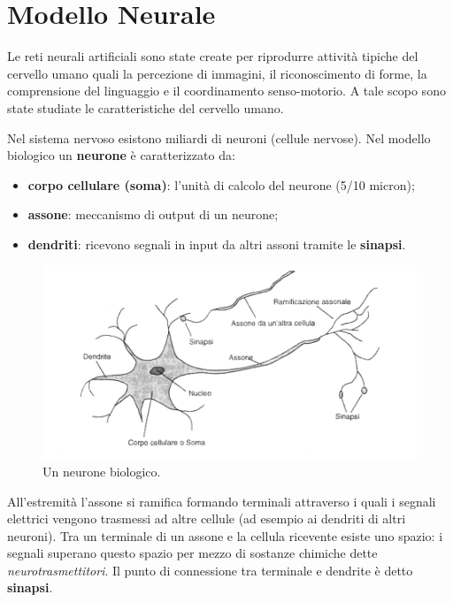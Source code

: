 
\chapter{Modello Neurale}
\label{cha:modello_neurale}

Le reti neurali artificiali sono state create per riprodurre attività tipiche del cervello umano quali la percezione di immagini, il riconoscimento di forme, la comprensione del linguaggio e il coordinamento senso-motorio. A tale scopo sono state studiate le caratteristiche del cervello umano.								

Nel sistema nervoso esistono miliardi di neuroni (cellule nervose). Nel modello biologico un \textbf{neurone} è caratterizzato da:
\begin{itemize}
	\item \textbf{corpo cellulare (soma)}: l'unità di calcolo del neurone (5/10 micron);
	\item \textbf{assone}: meccanismo di output di un neurone;
	\item \textbf{dendriti}: ricevono segnali in input da altri assoni tramite le \textbf{sinapsi}.
\end{itemize}
\begin{figure}[h!]
	\centering
	\includegraphics[width=\textwidth]{images/neuron.png}
	\caption{Un neurone biologico.}\label{fig:neuron}
\end{figure}
All'estremità l'assone si ramifica formando terminali attraverso i quali i segnali elettrici vengono trasmessi ad altre cellule (ad esempio ai dendriti di altri neuroni). Tra un terminale di un assone e la cellula ricevente esiste uno spazio: i segnali superano questo spazio per mezzo di sostanze chimiche dette \emph{neurotrasmettitori}. Il punto di connessione tra terminale e dendrite è detto \textbf{sinapsi}.

